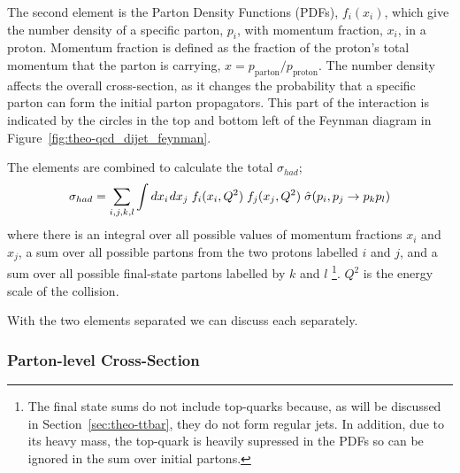 The second element is the Parton Density Functions (PDFs), $f_i(x_i)$, which give the number density of
a specific parton, $p_i$, with momentum fraction, $x_i$, in a proton.
Momentum fraction is defined as the fraction of the proton's total momentum that the parton is carrying, $x = p_{\text{parton}}/p_{\text{proton}}$.
The number density affects the overall cross-section, as it changes the probability that a specific parton
can form the initial parton propagators.
This part of the interaction is indicated by the circles in the
top and bottom left of the Feynman diagram in Figure~\ref{fig:theo-qcd_dijet_feynman}.

The elements are combined to calculate the total $\sigma_{had}$;
\begin{equation}
  \sigma_{had} = \sum_{i,j,k,l} \int dx_i\hspace{0.3mm} dx_j \hspace{1mm} f_i(x_i,Q^2)\hspace{1mm}f_j(x_j,Q^2)\hspace{1mm}\hat{\sigma}(p_i, p_j\to p_k p_l)
\end{equation}
where there is an integral over all possible values of momentum fractions $x_i$ and $x_j$,
a sum over all possible partons from the two protons labelled $i$ and $j$,
and a sum over all possible final-state partons labelled by $k$ and $l$
\footnote{The final state sums do not include top-quarks because, as will be discussed in Section~\ref{sec:theo-ttbar}, they do not form regular jets. 
  In addition, due to its heavy mass, the top-quark is heavily supressed in the PDFs so can be ignored in the sum over initial partons.}.
$Q^2$ is the energy scale of the collision.

\noindent
With the two elements separated we can discuss each separately.

\subsubsection{Parton-level Cross-Section}
\label{sec:theo-qcd_dijet_xs}

